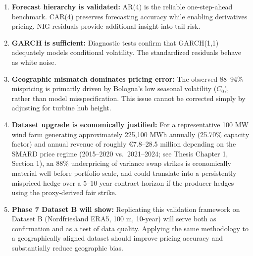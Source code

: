 \documentclass[11pt, a4paper, twoside]{article}
\begin{document}
\begin{enumerate}
    \item \textbf{Forecast hierarchy is validated:}
    AR(4) is the reliable one-step-ahead benchmark. CAR(4)
    preserves forecasting accuracy while enabling derivatives
    pricing. NIG residuals provide additional insight into
    tail risk.

    \item \textbf{GARCH is sufficient:}
    Diagnostic tests confirm that GARCH(1,1) adequately models
    conditional volatility. The standardized residuals behave
    as white noise.

    \item \textbf{Geographic mismatch dominates pricing error:}
    The observed 88--94\% mispricing is primarily driven by
    Bologna's low seasonal volatility ($C_0$), rather than
    model misspecification. This issue cannot be corrected
    simply by adjusting for turbine hub height.

    \item \textbf{Dataset upgrade is economically justified:}
    For a representative 100 MW wind farm generating
    approximately 225,100 MWh annually (25.70\% capacity
    factor) and annual revenue of roughly €7.8--28.5 million
    depending on the SMARD price regime (2015--2020 vs.\
    2021--2024; see Thesis Chapter 1, Section 1), an 88\%
    underpricing of variance swap strikes is economically
    material well before portfolio scale, and could translate
    into a persistently mispriced hedge over a 5--10 year
    contract horizon if the producer hedges using the
    proxy-derived fair strike.

    \item \textbf{Phase 7 Dataset B will show:}
    Replicating this validation framework on Dataset B
    (Nordfriesland ERA5, 100 m, 10-year) will serve both as
    confirmation and as a test of data quality. Applying the
    same methodology to a geographically aligned dataset
    should improve pricing accuracy and substantially reduce
    geographic bias.
\end{enumerate}
\end{document}
